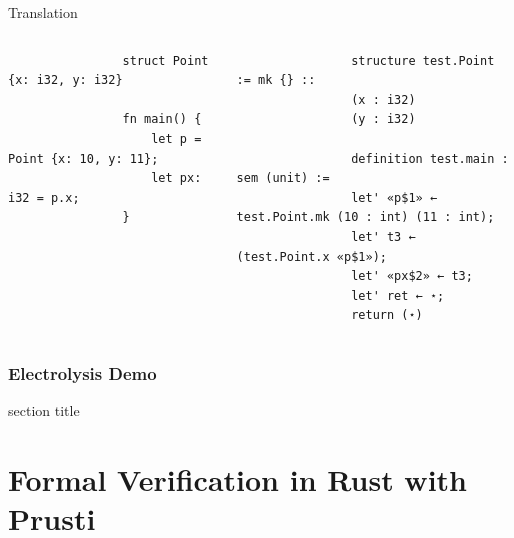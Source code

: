 \documentclass[usenames,dvipsnames,aspectratio=169]{beamer}
\begin{document}
\begin{frame}[fragile]{Translation}
    \begin{columns}
        \begin{block}{}
            \begin{verbatim}
                struct Point {x: i32, y: i32}

                fn main() {
                    let p = Point {x: 10, y: 11};
                    let px: i32 = p.x;
                }
            \end{verbatim}
        \end{block}

        \begin{block}{}
            \begin{verbatim}
                structure test.Point := mk {} ::
                (x : i32)
                (y : i32)

                definition test.main : sem (unit) :=
                let' «p$1» ← test.Point.mk (10 : int) (11 : int);
                let' t3 ← (test.Point.x «p$1»);
                let' «px$2» ← t3;
                let' ret ← ⋆;
                return (⋆)
            \end{verbatim}
        \end{block}
    \end{columns}
\end{frame}

\subsubsection{Electrolysis Demo}
\begin{frame}
    \begingroup
    \begin{beamercolorbox}[sep=12pt,center]{section title}
    \end{beamercolorbox}
    \endgroup
\end{frame}

\section{Formal Verification in Rust with Prusti}
\begin{frame}\sectionpage\end{frame}
\end{document}

